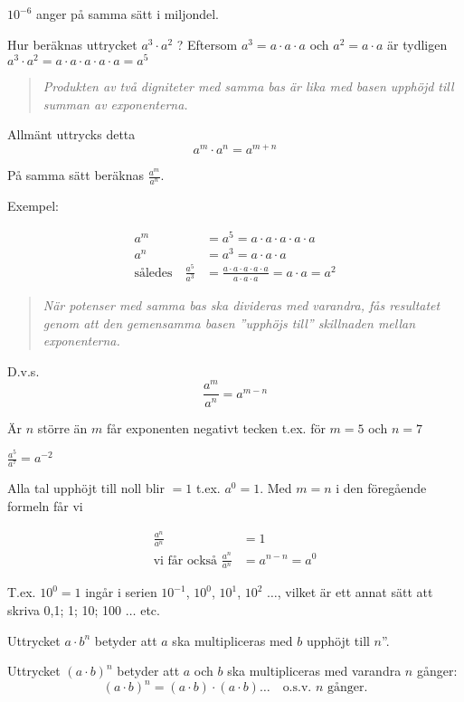 \(10^{-6}\) anger på samma sätt i miljondel.

Hur beräknas uttrycket \(a^3 \cdot a^2\) ?
Eftersom \(a^3 = a \cdot a \cdot a\) och \(a^2 = a \cdot a\) är tydligen
\(a^3 \cdot a^2 = a \cdot a \cdot a \cdot a \cdot a = a^5\)

\begin{quote}\emph{Produkten av två digniteter med samma bas är lika med basen
    upphöjd till summan av exponenterna.}\end{quote}

Allmänt uttrycks detta \[a^m \cdot a^n = a^{m+n}\]

På samma sätt beräknas \(\frac{a^m}{a^n}\).

Exempel:

\begin{align*}
a^m &= a^5 = a \cdot a \cdot a \cdot a \cdot a \\
a^n &= a^3 = a \cdot a \cdot a \\
\text{således} \quad
\frac{a^5}{a^3}&=\frac{a \cdot a \cdot a \cdot a \cdot a}{a \cdot a \cdot a} =
a \cdot a = a^2
\end{align*}

\begin{quote}\emph{När potenser med samma bas ska divideras med varandra, fås
resultatet genom att den gemensamma basen ''upphöjs till'' skillnaden mellan
exponenterna.}\end{quote}

D.v.s. \[\frac{a^m}{a^n} = a^{m-n}\]

Är \(n\) större än \(m\) får exponenten negativt tecken t.ex. för \(m = 5\) och \(n = 7\)

\(\frac{a^5}{a^7} = a^{-2}\)

Alla tal upphöjt till noll blir \(= 1\) t.ex. \(a^0 = 1\).
Med \(m = n\) i den föregående formeln får vi

\begin{align*}
  \frac{a^n}{a^n} &= 1 \\
  \text{vi får också }\frac{a^n}{a^n} &= a^{n-n} =a^0
\end{align*}

T.ex. \(10^0 = 1\) ingår i serien \(10^{-1}\), \(10^0\), \(10^1\), \(10^2\)
\(\ldots\), vilket
är ett annat sätt att skriva 0,1; 1; 10; 100 \(\ldots\) etc.

Uttrycket \(a \cdot b^n\) betyder att \(a\) ska multipliceras med \(b\) upphöjt
till \(n\)''.

Uttrycket \((a \cdot b)^n\) betyder att \(a\) och \(b\) ska multipliceras med
varandra \(n\) gånger:
\[
(a \cdot b)^n = (a \cdot b) \cdot (a \cdot b) \ldots
\quad \text{o.s.v. }n\text{ gånger.}
\]

